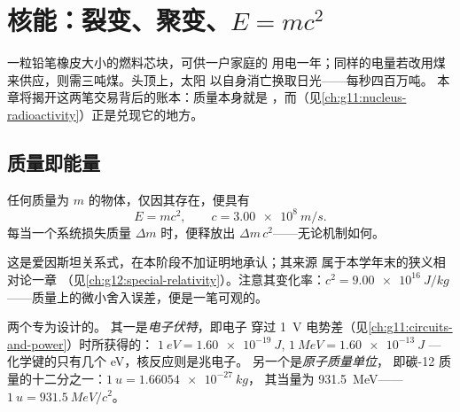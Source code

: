 \chapter{核能：裂变、聚变、$E=mc^2$}\label{ch:g12:nuclear-energy}

一粒铅笔橡皮大小的燃料芯块，可供一户家庭的
用电一年；同样的电量若改用煤来供应，则需三吨煤。头顶上，太阳
以自身消亡换取日光——每秒四百万吨。
本章将揭开这两笔交易背后的账本：质量本身就是
，而（见\cref{ch:g11:nucleus-radioactivity}）正是兑现它的地方。

\section{质量即能量}

\begin{theorem}[质能等价]\label{thm:g12:nuclear-energy:emc2}
任何质量为 $m$ 的物体，仅因其存在，便具有
\[
E = m c^2, \qquad c = \qty{3.00e8}{m/s}.
\]
每当一个系统损失质量 $\Delta m$ 时，便释放出
$\Delta m\, c^2$——无论机制如何。
\end{theorem}
\admitted

\begin{remark}[爱因斯坦，1905]\label{rem:g12:nuclear-energy:einstein}
这是爱因斯坦关系式，在本阶段不加证明地承认；其来源
属于本学年末的狭义相对论一章
（见\cref{ch:g12:special-relativity}）。注意其变化率：$c^2 = \qty{9.00e16}{J/kg}$
——质量上的微小舍入误差，便是一笔可观的。
\end{remark}

\begin{definition}[电子伏特与原子质量单位]\label{def:g12:nuclear-energy:units}
两个专为设计的。
其一是\emph{电子伏特}，即电子
穿过 \qty{1}{V} 电势差（见\cref{ch:g11:circuits-and-power}）时所获得的：
$\qty{1}{eV} = \qty{1.60e-19}{J}$, $\qty{1}{MeV} = \qty{1.60e-13}{J}$ ---
化学键的只有几个 \unit{eV}，核反应则是兆电子。
另一个是\emph{原子质量单位}，
即碳-12 质量的十二分之一：$\qty{1}{u} = \qty{1.66054e-27}{kg}$，
其当量为 \qty{931.5}{MeV}——$\qty{1}{u} = \qty{931.5}{MeV}/c^2$。
\end{definition}


